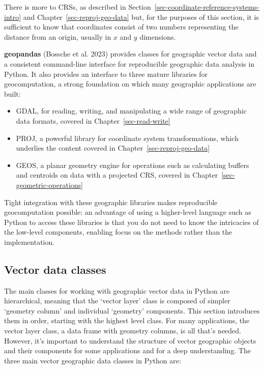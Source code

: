 \documentclass[
  letterpaper,
]{krantz}
\providecommand{\tightlist}{%
  \setlength{\itemsep}{0pt}\setlength{\parskip}{0pt}}\usepackage{longtable,booktabs,array}
\begin{document}
There is more to CRSs, as described in
Section~\ref{sec-coordinate-reference-systems-intro} and
Chapter~\ref{sec-reproj-geo-data} but, for the purposes of this section,
it is sufficient to know that coordinates consist of two numbers
representing the distance from an origin, usually in \(x\) and \(y\)
dimensions.

\textbf{geopandas} (Bossche et al. 2023) provides classes for geographic
vector data and a consistent command-line interface for reproducible
geographic data analysis in Python. It also provides an interface to
three mature libraries for geocomputation, a strong foundation on which
many geographic applications are built:

\begin{itemize}
\tightlist
\item
  GDAL, for reading, writing, and manipulating a wide range of
  geographic data formats, covered in Chapter~\ref{sec-read-write}
\item
  PROJ, a powerful library for coordinate system transformations, which
  underlies the content covered in Chapter~\ref{sec-reproj-geo-data}
\item
  GEOS, a planar geometry engine for operations such as calculating
  buffers and centroids on data with a projected CRS, covered in
  Chapter~\ref{sec-geometric-operations}
\end{itemize}

Tight integration with these geographic libraries makes reproducible
geocomputation possible: an advantage of using a higher-level language
such as Python to access these libraries is that you do not need to know
the intricacies of the low-level components, enabling focus on the
methods rather than the implementation.

\subsection{Vector data classes}\label{vector-data-classes}

The main classes for working with geographic vector data in Python are
hierarchical, meaning that the `vector layer' class is composed of
simpler `geometry column' and individual `geometry' components. This
section introduces them in order, starting with the highest level class.
For many applications, the vector layer class, a data frame with
geometry columns, is all that's needed. However, it's important to
understand the structure of vector geographic objects and their
components for some applications and for a deep understanding. The three
main vector geographic data classes in Python are:
\end{document}
